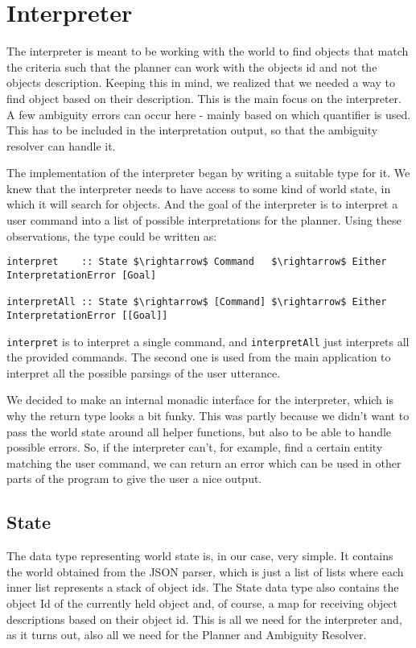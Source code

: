\section*{Interpreter}
The interpreter is meant to be working with the world to find objects that match the criteria such that the planner can work with the objects id and not the objects description.
Keeping this in mind, we realized that we needed a way to find object based on their description.
This is the main focus on the interpreter. A few ambiguity errors can occur here - mainly based on which quantifier is used.
This has to be included in the interpretation output, so that the ambiguity resolver can handle it.

The implementation of the interpreter began by writing a suitable type for it.
We knew that the interpreter needs to have access to some kind of world state, in which it will search for objects.
And the goal of the interpreter is to interpret a user command into a list of possible interpretations for the planner.
Using these observations, the type could be written as:

\begin{lstlisting}
interpret    :: State $\rightarrow$ Command   $\rightarrow$ Either InterpretationError [Goal]

interpretAll :: State $\rightarrow$ [Command] $\rightarrow$ Either InterpretationError [[Goal]]
\end{lstlisting}

\verb|interpret| is to interpret a single command, and \verb|interpretAll| just interprets all the provided commands. The second one is used from the main application to interpret all the possible parsings of the user utterance.

We decided to make an internal monadic interface for the interpreter, which is why the return type looks a bit funky.
This was partly because we didn't want to pass the world state around all helper functions, but also to be able to handle possible errors.
So, if the interpreter can't, for example, find a certain entity matching the user command, we can return an error which can be used in other parts of the program to give the user a nice output.

\subsection*{State}
The data type representing world state is, in our case, very simple.
It contains the world obtained from the JSON parser, which is just a list of lists where each inner list represents a stack of object ids.
The State data type also contains the object Id of the currently held object and, of course, a map for receiving object descriptions based on their object id. This is all we need for the interpreter and, as it turns out, also all we need for the Planner and Ambiguity Resolver.

